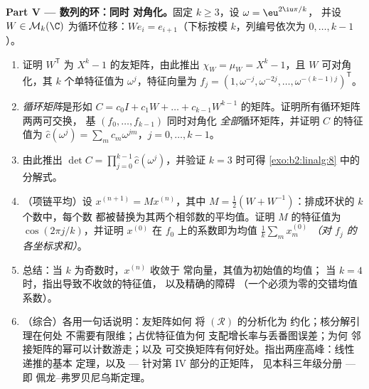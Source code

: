 \begin{problem}
\medskip
\noindent\textbf{Part V --- 数列的环：同时
对角化。}固定 $k \geq 3$，设 $\omega = \eu^{2\iu\pi/k}$，
        并设 $W \in \mathcal{M}_k(\C)$ 为循环位移：$W e_i =
e_{i+1}$（下标按模 $k$，列编号依次为 $0, \dots, k-1$）。
\begin{enumerate}[resume]
  \item 证明 $W^{\mathsf T}$ 为
        $X^k - 1$ 的友矩阵，由此推出 $\chi_W = \mu_W = X^k - 1$，且 $W$
        可对角化，其 $k$ 个单特征值为
        $\omega^j$，特征向量为 $f_j = (1, \omega^{-j},
        \omega^{-2j}, \dots, \omega^{-(k-1)j})^{\mathsf T}$。
  \item \emph{循环矩阵}是形如 $C = c_0 I + c_1 W + \dots
        + c_{k-1}W^{k-1}$ 的矩阵。证明所有循环矩阵两两可交换，
        基 $(f_0, \dots, f_{k-1})$ 同时对角化
        \emph{全部}循环矩阵，并证明
        $C$ 的特征值为 $\widehat c(\omega^j) = \sum_m
        c_m \omega^{jm}$，$j = 0, \dots, k-1$。
  \item 由此推出 $\det C = \prod_{j=0}^{k-1} \widehat
        c(\omega^j)$，并验证 $k = 3$ 时可得
        \cref{exo:b2:linalg:8} 中的分解式。
  \item （项链平均）设 $x^{(n+1)} = Mx^{(n)}$，其中
        $M = \frac12(W + W^{-1})$：排成环状的 $k$ 个数中，每个数
        都被替换为其两个相邻数的平均值。证明
        $M$ 的特征值为
        $\cos(2\pi j/k)$，并证明 $x^{(0)}$ 在
        $f_0$ 上的系数即为均值 $\frac1k\sum_m x^{(0)}_m$
        \emph{（对 $f_j$ 的各坐标求和）}。
  \item 总结：当 $k$ 为奇数时，$x^{(n)}$ 收敛于
        常向量，其值为初始值的均值；
        当 $k = 4$ 时，指出导致不收敛的特征值，
        以及精确的障碍
        （一个必须为零的交错均值系数）。
  \item （综合）各用一句话说明：友矩阵如何
        将 $(\mathcal R)$ 的分析化为
        约化；核分解引理在何处
        不需要有限维；占优特征值为何
        支配增长率与丢番图误差；为何
        邻接矩阵的幂可以计数游走；以及
        可交换矩阵有何好处。指出两座高峰：线性递推的基本
        定理，以及 --- 针对第 IV 部分的正矩阵，
        见本科三年级分册 --- 即
        佩龙--弗罗贝尼乌斯定理。
\end{enumerate}
\end{problem}
